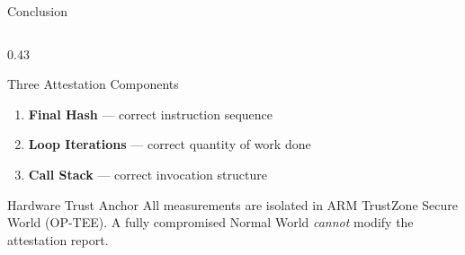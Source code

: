 \documentclass[aspectratio=169]{beamer}
\begin{document}
\begin{frame}{Conclusion}
\begin{columns}[T]
\begin{column}{0.43\textwidth}
  \medskip
  \begin{exampleblock}{Three Attestation Components}
    \begin{enumerate}\small
      \item \textbf{Final Hash} — correct instruction sequence
      \item \textbf{Loop Iterations} — correct quantity of work done
      \item \textbf{Call Stack} — correct invocation structure
    \end{enumerate}
  \end{exampleblock}

  \medskip
  \begin{alertblock}{Hardware Trust Anchor}
    \small
    All measurements are isolated in ARM TrustZone Secure World
    (OP-TEE). A fully compromised Normal World \emph{cannot}
    modify the attestation report.
  \end{alertblock}

\end{column}

\end{columns}
\end{frame}
\end{document}

